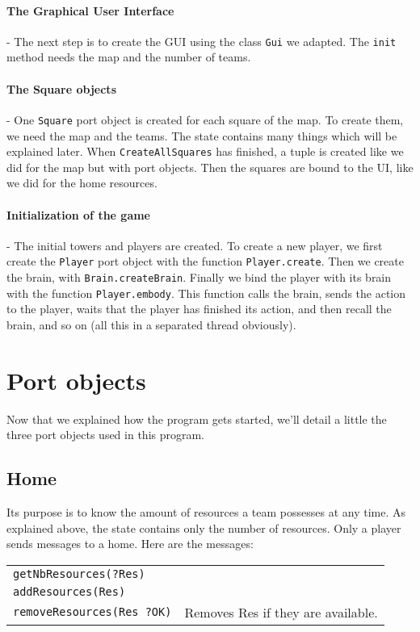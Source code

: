 \paragraph{The Graphical User Interface}
- The next step is to create the GUI using the class \texttt{Gui} we adapted. The \texttt{init} method needs the map and the number of teams.

\paragraph{The Square objects}
- One \texttt{Square} port object is created for each square of the map. To create them, we need the map and the teams. The state contains many things which will be explained later. When \texttt{CreateAllSquares} has finished, a tuple is created like we did for the map but with port objects. Then the squares are bound to the UI, like we did for the home resources.

\paragraph{Initialization of the game}
- The initial towers and players are created. To create a new player, we first create the \texttt{Player} port object with the function \texttt{Player.create}. Then we create the brain, with \texttt{Brain.createBrain}. Finally we bind the player with its brain with the function \texttt{Player.embody}. This function calls the brain, sends the action to the player, waits that the player has finished its action, and then recall the brain, and so on (all this in a separated thread obviously).

\section{Port objects}
Now that we explained how the program gets started, we'll detail a little the three port objects used in this program.

\subsection{Home}
Its purpose is to know the amount of resources a team possesses at any time. As explained above, the state contains only the number of resources. Only a player sends messages to a home. Here are the messages:

\bigskip
\begin{tabular}{ll}
  \texttt{getNbResources(?Res)} & \\
  \texttt{addResources(Res)} & \\
  \texttt{removeResources(Res ?OK)} & Removes Res if they are available.
\end{tabular}

